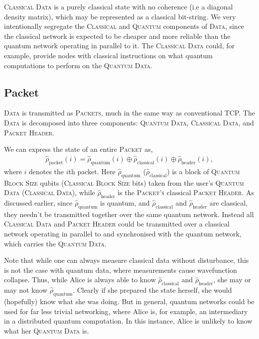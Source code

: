 \documentclass[aps,rmp,twocolumn,amsmath,amssymb,nofootinbib,superscriptaddress,longbibliography,floatfix,table-of-contents,eqsecnum]{revtex4-1}
\begin{document}
\textsc{Classical Data} is a purely classical state with no coherence (i.e a diagonal density matrix), which may be represented as a classical bit-string. We very intentionally segregate the \textsc{Classical} and \textsc{Quantum} components of \textsc{Data}, since the classical network is expected to be cheaper and more reliable than the quantum network operating in parallel to it. The \textsc{Classical Data} could, for example, provide nodes with classical instructions on what quantum computations to perform on the \textsc{Quantum Data}.

%
%

\subsection{Packet} 

\textsc{Data} is transmitted as \textsc{Packets}, much in the same way as conventional TCP. The \textsc{Data} is decomposed into three components: \textsc{Quantum Data}, \textsc{Classical Data}, and \textsc{Packet Header}.

We can express the state of an entire \textsc{Packet} as,
\begin{align}
\hat\rho_\text{packet}(i) = \hat\rho_\text{quantum}(i) \oplus \hat\rho_\text{classical}(i) \oplus \hat\rho_\text{header}(i),
\end{align}
where $i$ denotes the $i$th packet. Here $\hat\rho_\text{quantum}$ ($\hat\rho_\text{classical}$) is a block of \textsc{Quantum Block Size} qubits (\textsc{Classical Block Size} bits) taken from the user's \textsc{Quantum Data} (\textsc{Classical Data}), while $\hat\rho_\text{header}$ is the \textsc{Packet's} classical \textsc{Packet Header}. As discussed earlier, since $\hat\rho_\text{quantum}$ is quantum, and $\hat\rho_\text{classical}$ and $\hat\rho_\text{header}$ are classical, they needn't be transmitted together over the same quantum network. Instead all \textsc{Classical Data} and \textsc{Packet Header} could be transmitted over a classical network operating in parallel to and synchronised with the quantum network, which carries the \textsc{Quantum Data}.

Note that while one can always measure classical data without disturbance, this is not the case with quantum data, where measurements cause wavefunction collapse. Thus, while Alice is always able to know $\hat\rho_\text{classical}$ and $\hat\rho_\text{header}$, she may or may not know $\hat\rho_\text{quantum}$. Clearly if she prepared the state herself, she would (hopefully) know what she was doing. But in general, quantum networks could be used for far less trivial networking, where Alice is, for example, an intermediary in a distributed quantum computation. In this instance, Alice is unlikely to know what her \textsc{Quantum Data} is.
\end{document}
